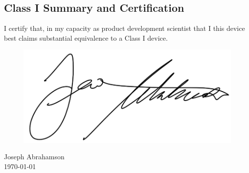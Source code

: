 \newpage
\subsection{Class I Summary and Certification}

I certify that, in my capacity as product development scientist that I
this device best claims substantial equivalence to a Class I device.

\begin{figure}[H]
  \includegraphics[width=0.35\linewidth]{imgs/ja-sig}
\end{figure}

\noindent Joseph Abrahamson \\
\today

